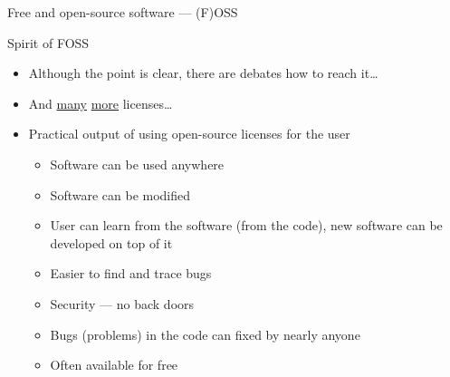 \documentclass[compress, ucs, xelatex, 11pt, xcolor=svgnames, aspectratio=169,
	hyperref={
		bookmarks=true,
		unicode=true,
		colorlinks=true,
		pdftitle={Linux, command line and MetaCentrum},
		plainpages=false,
		pdfauthor={Vojtech Zeisek},
		pdfsubject={Course about use of Linux command line, writing shell scripts and using MetaCentrum of CESNET},
		pdfcreator={XeLaTeX},
		pdfkeywords={Linux, GNU, BASH, shell, command line, MetaCentrum},
		linkcolor=DarkRed, %
		anchorcolor=DarkBlue, %
		citecolor=Indigo, %
		filecolor=NavyBlue, %
		menucolor=DarkMagenta, %
		urlcolor=DarkBlue, %
		pdftex},
	url={hyphens, lowtilde} %
	]{beamer}
\begin{document}
\begin{frame}[allowframebreaks]{Free and open-source software --- (F)OSS}
\begin{block}{Spirit of FOSS}
\begin{itemize}
\begin{itemize}
				\item Although the point is clear, there are debates how to reach it\ldots
			\end{itemize}
		\end{itemize}
	\end{block}
	\begin{itemize}
		\item And \href{https://en.wikipedia.org/wiki/Comparison_of_free_and_open-source_software_licenses}{many} \href{https://opensource.org/licenses}{more} licenses\ldots
		\item Practical output of using open-source licenses for the user
		\begin{itemize}
			\item Software can be used anywhere
			\item Software can be modified
			\item User can learn from the software (from the code), new software can be developed on top of it
			\item Easier to find and trace bugs
			\item Security --- no back doors
			\item Bugs (problems) in the code can fixed by nearly anyone
			\item Often available for free
		\end{itemize}
	\end{itemize}
\end{frame}
\end{document}
